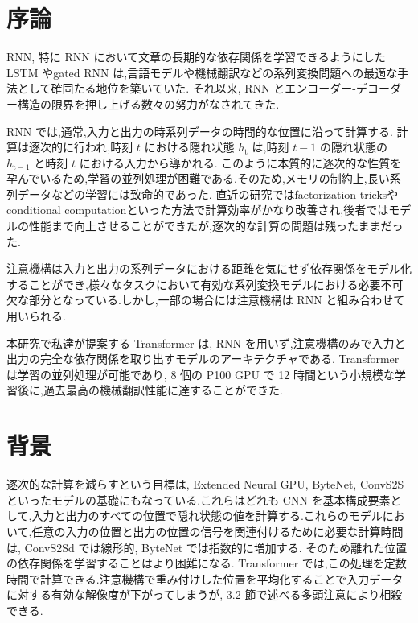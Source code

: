 \documentclass{jarticle}     %
\begin{document}
\section{序論}
RNN, 特に RNN において文章の長期的な依存関係を学習できるようにした LSTM\cite{LSTM,12} やgated RNN \cite{GRU,7} は,言語モデルや機械翻訳\cite{29,2,5}などの系列変換問題への最適な手法として確固たる地位を築いていた.
それ以来, RNN とエンコーダー-デコーダー構造の限界を押し上げる数々の努力がなされてきた.\cite{31,21,13}
\par
RNN では,通常,入力と出力の時系列データの時間的な位置に沿って計算する.
計算は逐次的に行われ,時刻 $t$ における隠れ状態 $h_\mathrm{t}$ は,時刻 $t-1$ の隠れ状態の $h_\mathrm{t-1}$ と時刻 $t$ における入力から導かれる.
このように本質的に逐次的な性質を孕んでいるため,学習の並列処理が困難である.そのため,メモリの制約上,長い系列データなどの学習には致命的であった.
直近の研究ではfactorization tricks\cite{18}やconditional computation\cite{26}といった方法で計算効率がかなり改善され,後者ではモデルの性能まで向上させることができたが,逐次的な計算の問題は残ったままだった.\par
注意機構は入力と出力の系列データにおける距離を気にせず依存関係をモデル化することができ,様々なタスクにおいて有効な系列変換モデルにおける必要不可欠な部分となっている.\cite{2,16}しかし,一部の場合\cite{22}には注意機構は RNN と組み合わせて用いられる.\par
本研究で私達が提案する Transformer は, RNN を用いず,注意機構のみで入力と出力の完全な依存関係を取り出すモデルのアーキテクチャである.
 Transformer は学習の並列処理が可能であり, 8 個の P100 GPU で 12 時間という小規模な学習後に,過去最高の機械翻訳性能に達することができた.


\section{背景}
逐次的な計算を減らすという目標は, Extended Neural GPU\cite{20}, ByteNet\cite{15}, ConvS2S\cite{8} といったモデルの基礎にもなっている.これらはどれも CNN を基本構成要素として,入力と出力のすべての位置で隠れ状態の値を計算する.これらのモデルにおいて,任意の入力の位置と出力の位置の信号を関連付けるために必要な計算時間は, ConvS2Sd では線形的, ByteNet では指数的に増加する.
そのため離れた位置の依存関係を学習することはより困難になる.\cite{11}
 Transformer では,この処理を定数時間で計算できる.注意機構で重み付けした位置を平均化することで入力データに対する有効な解像度が下がってしまうが, 3.2 節で述べる多頭注意により相殺できる.\par
\end{document}

